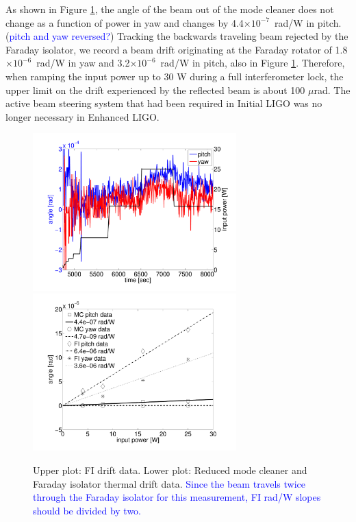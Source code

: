 As shown in Figure \ref{fig:drift}, the angle of the beam out of the
mode cleaner does not change as a function of power in yaw and changes
by 4.4$\times 10^{-7}$~rad/W in pitch. (\textcolor{blue}{pitch and yaw
  reversed?})  Tracking the backwards traveling beam rejected by the
Faraday isolator, we record a beam drift originating at the Faraday
rotator of 1.8$\times 10^{-6}$~rad/W in yaw and 3.2$\times
10^{-6}$~rad/W in pitch, also in Figure
\ref{fig:drift}. Therefore, when ramping the input power up to 30 W
during a full interferometer lock, the upper limit on the drift experienced by
the reflected beam is about 100 $\mu$rad. The active beam steering
system that had been required in Initial LIGO was no longer necessary
in Enhanced LIGO.
\begin{figure}
\begin{centering}
\includegraphics[width=0.7\textwidth]{figures/forpaper_refldrift.pdf}
\includegraphics[width=0.7\textwidth]{figures/alldrift.pdf}
\caption{Upper plot: FI drift data. Lower plot: Reduced mode cleaner and Faraday isolator thermal drift data. \textcolor{blue}{Since the beam travels twice through the Faraday isolator for
  this measurement, FI rad/W slopes should be divided by two.}}
\label{fig:drift}
\end{centering}
\end{figure}

